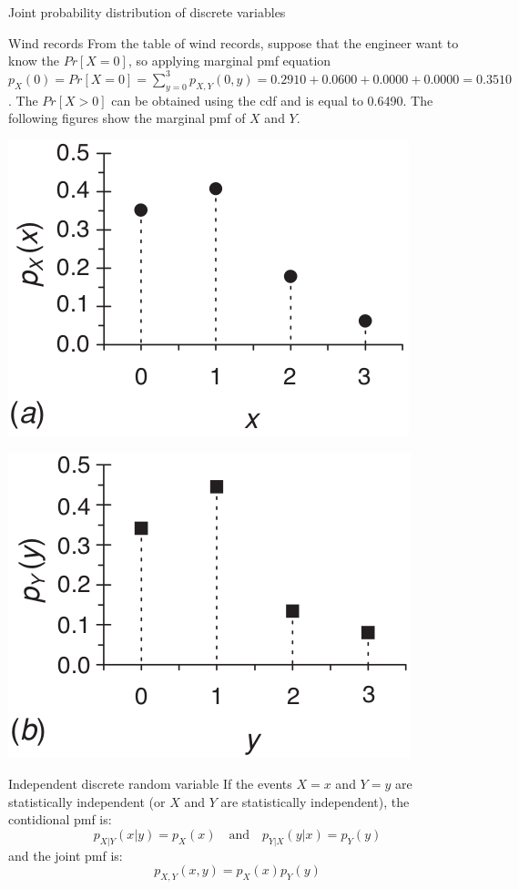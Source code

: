 \documentclass[8pt]{beamer}
\renewcommand{\emph}[1]{\textcolor{myorange}{#1}}
\begin{document}
\begin{frame}{Joint probability distribution of discrete variables}
     \begin{exampleblock}{Wind records}
         From the table of wind records, suppose that the engineer want to know the $Pr[X=0]$, so applying marginal \emph{pmf} equation  $p_X (0) = Pr[X = 0] = \sum_{y=0}^3 p_{X,Y}(0,y) = 0.2910 + 0.0600 + 0.0000 + 0.0000 = 0.3510$. The $Pr[X>0]$ can be obtained using the \emph{cdf} and is equal to 0.6490. The following figures show the marginal \emph{pmf} of $X$ and $Y$. 
\begin{minipage}[t]{0.49\textwidth}
\centering
         \includegraphics[width=0.6\linewidth]{fi331a.png}        
\end{minipage}
\hfill
\begin{minipage}[t]{0.49\textwidth}
\centering
         \includegraphics[width=0.6\linewidth]{fi331b.png}        
\end{minipage}
    \end{exampleblock}
    \begin{block}{Independent discrete random variable}
        If the events $X = x$ and $Y = y$ are statistically independent (or $X$ and $Y$ are statistically independent), the contidional \emph{pmf} is:
        \[
            \displaystyle
            p_{X|Y} (x|y) = p_X (x) \quad \text{and} \quad p_{Y|X} (y|x) = p_Y (y)
        \]
        and the joint \emph{pmf} is:
        \[
            \displaystyle
            p_{X,Y}(x,y) = p_X (x) p_Y (y)
        \]
   \end{block}
\end{frame}
\end{document}
